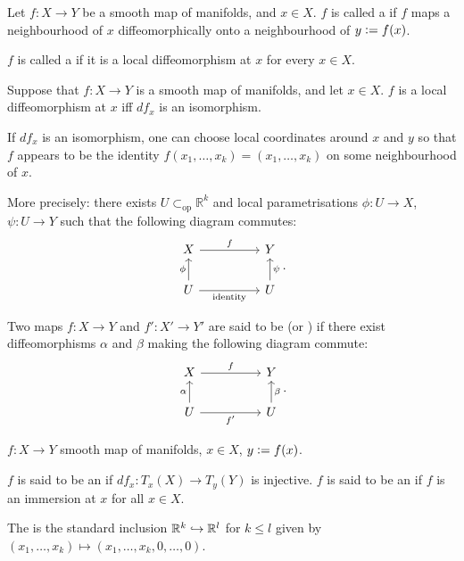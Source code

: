 \documentclass[12pt]{article}
\newcommand{\opsub}{\subset_{\operatorname{op}}}
\begin{document}
\begin{defn}
	Let $f : X \to Y$ be a smooth map of manifolds, and $x \in X$. $f$ is called a  if $f$ maps a neighbourhood of $x$ diffeomorphically onto a neighbourhood of $y \vcentcolon= f(x)$.

	$f$ is called a  if it is a local diffeomorphism at $x$ for every $x \in X$.
\end{defn}

\begin{thm}
	Suppose that $f : X \to Y$ is a smooth map of manifolds, and let $x \in X$. \newline
	$f$ is a local diffeomorphism at $x$ iff $df_{x}$ is an isomorphism.
\end{thm}

\begin{rem}
	If $df_{x}$ is an isomorphism, one can choose local coordinates around $x$ and $y$ so that $f$ appears to be the identity $f(x_{1}, \ldots, x_{k}) = (x_{1}, \ldots, x_{k})$ on some neighbourhood of $x$.

	More precisely: there exists $U \opsub \mathbb{R}^{k}$ and local parametrisations $\phi : U \to X$, $\psi : U \to Y$ such that the following diagram commutes:
	\begin{equation*} 
		\begin{tikzcd}
			X \arrow[rr, "f"] & & Y \\
			U \arrow[u, "\phi"] \arrow[rr, "\text{identity}"'] & & U \arrow[u, "\psi"']
		\end{tikzcd}.
	\end{equation*}
\end{rem}

\begin{defn}
	Two maps $f : X \to Y$ and $f' : X' \to Y'$ are said to be  (or ) if there exist diffeomorphisms $\alpha$ and $\beta$ making the following diagram commute:
	\begin{equation*}  
		\begin{tikzcd}
			X \arrow[rr, "f"] & & Y \\
			U \arrow[u, "\alpha"] \arrow[rr, "f'"'] & & U \arrow[u, "\beta"']
		\end{tikzcd}.		
	\end{equation*}
\end{defn}

\begin{defn} \label{defn:immersions}
	$f : X \to Y$ smooth map of manifolds, $x \in X$, $y \vcentcolon= f(x)$.

	$f$ is said to be an  if $df_{x} : T_{x}(X) \to T_{y}(Y)$ is injective. \newline
	$f$ is said to be an  if $f$ is an immersion at $x$ for all $x \in X$. 

	The  is the standard inclusion $\mathbb{R}^{k} \hookrightarrow \mathbb{R}^{l}$ for $k \le l$ given by $(x_{1}, \ldots, x_{k}) \mapsto (x_{1}, \ldots, x_{k}, 0, \ldots, 0)$.
\end{defn}
\end{document}
